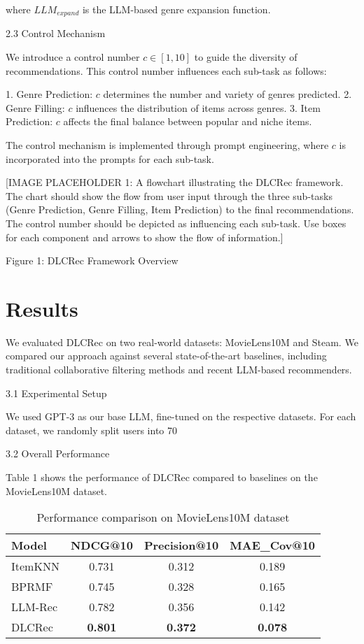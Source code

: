 \documentclass[12pt,letterpaper]{article}
\begin{document}
where $LLM_{expand}$ is the LLM-based genre expansion function.

2.3 Control Mechanism

We introduce a control number $c \in [1, 10]$ to guide the diversity of recommendations. This control number influences each sub-task as follows:

1. Genre Prediction: $c$ determines the number and variety of genres predicted.
2. Genre Filling: $c$ influences the distribution of items across genres.
3. Item Prediction: $c$ affects the final balance between popular and niche items.

The control mechanism is implemented through prompt engineering, where $c$ is incorporated into the prompts for each sub-task.

[IMAGE PLACEHOLDER 1: A flowchart illustrating the DLCRec framework. The chart should show the flow from user input through the three sub-tasks (Genre Prediction, Genre Filling, Item Prediction) to the final recommendations. The control number should be depicted as influencing each sub-task. Use boxes for each component and arrows to show the flow of information.]

Figure 1: DLCRec Framework Overview

\section{Results}

We evaluated DLCRec on two real-world datasets: MovieLens10M and Steam. We compared our approach against several state-of-the-art baselines, including traditional collaborative filtering methods and recent LLM-based recommenders.

3.1 Experimental Setup

We used GPT-3 as our base LLM, fine-tuned on the respective datasets. For each dataset, we randomly split users into 70%

3.2 Overall Performance

Table 1 shows the performance of DLCRec compared to baselines on the MovieLens10M dataset.

\begin{table}[h]
\centering
\begin{tabular}{lccc}
\hline
Model & NDCG@10 & Precision@10 & MAE_Cov@10 \\
\hline
ItemKNN & 0.731 & 0.312 & 0.189 \\
BPRMF & 0.745 & 0.328 & 0.165 \\
LLM-Rec & 0.782 & 0.356 & 0.142 \\
DLCRec & \textbf{0.801} & \textbf{0.372} & \textbf{0.078} \\
\hline
\end{tabular}
\caption{Performance comparison on MovieLens10M dataset}
\label{tab:results}
\end{table}
\end{document}
